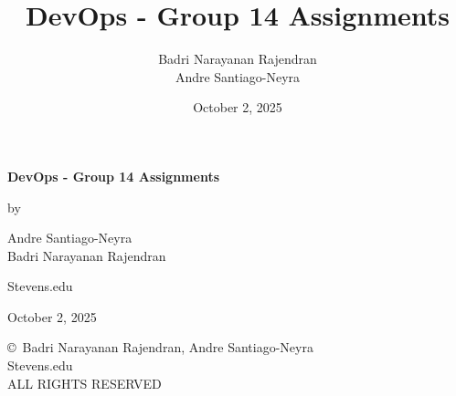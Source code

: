 \documentclass[12pt,a4paper]{report}
\title{DevOps - Group 14 Assignments}
\date{October 2, 2025}
\author{
    Badri Narayanan Rajendran \\
    Andre Santiago-Neyra 
}
\begin{document}

\begin{titlepage}
    \centering
    \vspace*{5cm}
    
    {\Huge\bfseries DevOps - Group 14 Assignments\par}
    
    \vspace{1cm}
    
    {\Large by\par}
    
    \vspace{0.5cm}
    
    {\Large
    Andre Santiago-Neyra\\
    Badri Narayanan Rajendran\\
    }
    
    \vspace{1cm}
    
    {\large Stevens.edu\par}
    
    \vfill
    
    {\large October 2, 2025\par}
    
\end{titlepage}

\newpage
\thispagestyle{empty}
\vspace*{\fill}
\begin{center}
    \copyright\ Badri Narayanan Rajendran, Andre Santiago-Neyra\\
    Stevens.edu\\
    ALL RIGHTS RESERVED
\end{center}
\vspace*{\fill}

\clearpage


\clearpage


\tableofcontents

\listoftables

\listoffigures

\clearpage
\setcounter{page}{1}








\clearpage
\printnoidxglossaries

\clearpage



\clearpage
\printindex
\end{document}
